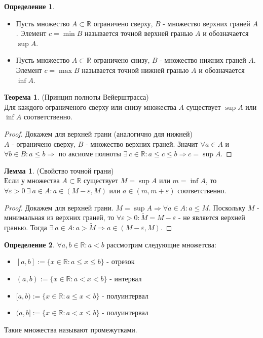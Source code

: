 \documentclass[a4paper, 12pt]{article}
\newcommand{\R}{\mathbb{R}}
\renewcommand{\epsilon}{\varepsilon}
\newcommand\tab[1][.5cm]{\hspace*{#1}}
\theoremstyle{definition}
\newtheorem*{definition}{Определение}
\newtheorem*{theorem}{Теорема}
\newtheorem*{lemma}{Лемма}
\begin{document}
        \begin{definition} \tab
            \begin{itemize}
                \item Пусть множество $A \subset \R$ ограничено сверху, $B$ - множество верхних граней $A$. Элемент $c=\min B$ называется точной верхней гранью $A$ и обозначается $\sup A$.
                \item Пусть множество $A \subset \R$ ограничено снизу, $B$ - множество нижних граней $A$. Элемент $c=\max B$ называется точной нижней гранью $A$ и обозначается $\inf A$.
            \end{itemize}
        \end{definition}
        \begin{theorem} (Принцип полноты Вейерштрасса) \\
            Для каждого ограниченого сверху или снизу множества $A$ существует $\sup A$ или $\inf A$ соответственно.
        \end{theorem}
        \begin{proof}
            Докажем для верхней грани (аналогично для нижней)\\
            $A$ - ограничено сверху, $B$ - множество верхних граней. Значит $\forall a\in A$ и \\$\forall b\in B: a\leq b \Rightarrow$ по аксиоме полноты $\exists\ c\in \R: a\leq c\leq b \Rightarrow c=\sup A$.
        \end{proof}
        \begin{lemma} (Свойство точной грани)\\
            Если у множества $A\subset \R$ существует $M=\sup{A}$ или $m=\inf{A}$, то $\forall \epsilon>0\ \exists\ a\in A: a\in (M-\epsilon,M)$ или $a\in (m,m+\epsilon)$ соответственно.
        \end{lemma}
        \begin{proof}
            Докажем для верхней грани. $M=\sup{A}\Rightarrow \forall a\in A: a\leq M$. Поскольку $M$ - минимальная из верхних граней, то $\forall \epsilon>0: \widetilde{M}=M-\epsilon$ - не является верхней гранью. Тогда $\exists\ a\in A: a>\widetilde{M} \Rightarrow a\in (M-\epsilon,M)$.
        \end{proof} 
        \begin{definition}
            $\forall a,b\in \R: a<b$ рассмотрим следующие множетсва:
            \begin{itemize}
                \item $[a,b] := \{x\in \R: a\leq x\leq b\}$ - отрезок
                \item $(a,b) := \{x\in \R: a<x<b\}$ - интервал
                \item $[a,b) := \{x\in \R: a\leq x<b\}$ - полуинтервал
                \item $(a,b] := \{x\in \R: a<x\leq b\}$ - полуинтервал
            \end{itemize}
            Такие множества называют промежутками.
        \end{definition} 
\end{document}
